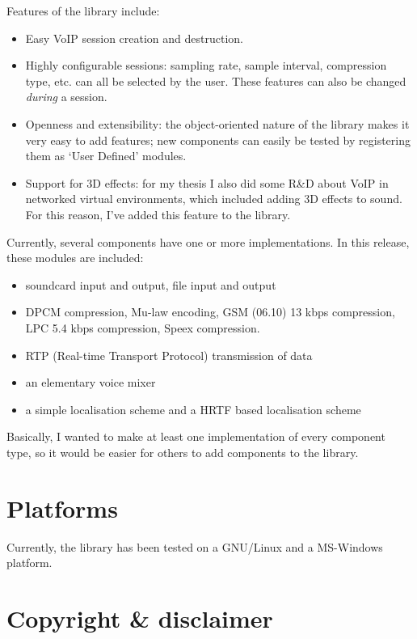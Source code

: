 	Features of the library include:
	\begin{itemize}
		\item Easy VoIP session creation and destruction.
		\item Highly configurable sessions: sampling rate, sample interval, compression
		      type, etc. can all be selected by the user. These features can also
		      be changed {\em during} a session.
		\item Openness and extensibility: the object-oriented nature of the library
		      makes it very easy to add features; new components can easily be tested
		      by registering them as `User Defined' modules.
		\item Support for 3D effects: for my thesis I also did some R\&D about VoIP
		      in networked virtual environments, which included adding 3D effects
		      to sound. For this reason, I've added this feature to the library.
	\end{itemize}
	
	Currently, several components have one or more implementations. In this release,
	these modules are included:
	\begin{itemize}
		\item soundcard input and output, file input and output
		\item DPCM compression, Mu-law encoding, GSM (06.10) 13 kbps compression, 
		      LPC 5.4 kbps compression, Speex compression.
		\item RTP (Real-time Transport Protocol) transmission of data
		\item an elementary voice mixer
		\item a simple localisation scheme and a HRTF based localisation scheme
	\end{itemize}

	Basically, I wanted to make at least one implementation of every component 
	type, so it would be easier for others to add components to the library.
	
	\section{Platforms}
	
	Currently, the library has been tested on a GNU/Linux and a MS-Windows platform.
	
	\section{Copyright \& disclaimer}
	
